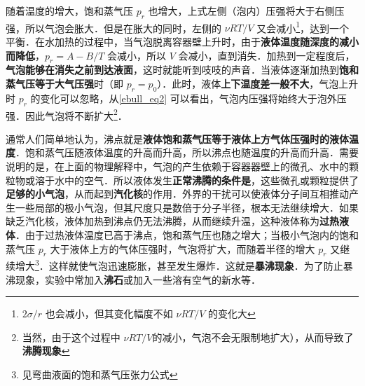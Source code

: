 随着温度的增大，饱和蒸气压 $p_r$ 也增大，上式左侧（泡内）压强将大于右侧压强，所以气泡会胀大．但是在胀大的同时，左侧的 $\nu RT/V$ 又会减小\footnote{$2\sigma/r$ 也会减小，但其变化幅度不如 $\nu RT/V$ 的变化大}，达到一个平衡．在水加热的过程中，当气泡脱离容器壁上升时，由于\textbf{液体温度随深度的减小而降低}，$p_r=A-B/T$ 会减小，所以 $V$ 会减小，直到消失．加热到一定程度后，\textbf{气泡能够在消失之前到达液面}，这时就能听到吱吱的声音．当液体逐渐加热到\textbf{饱和蒸气压等于大气压强}时（即 $p_r=p_0$）．此时，液体\textbf{上下温度差一般不大}，气泡上升时 $p_r$ 的变化可以忽略，从\autoref{ebull_eq2} 可以看出，气泡内压强将始终大于泡外压强．因此气泡将不断扩大\footnote{当然，由于这个过程中 $\nu RT/V$的减小，气泡不会无限制地扩大），从而导致了\textbf{沸腾现象}}．

通常人们简单地认为，沸点就是\textbf{液体饱和蒸气压等于液体上方气体压强时的液体温度}．饱和蒸气压随液体温度的升高而升高，所以沸点也随温度的升高而升高．需要说明的是，在上面的物理解释中，气泡的产生依赖于容器器壁上的微孔、水中的颗粒物或溶于水中的空气．所以液体发生\textbf{正常沸腾的条件是}，这些微孔或颗粒提供了\textbf{足够的小气泡}，从而起到\textbf{汽化核}的作用．外界的干扰可以使液体分子间互相推动产生一些局部的极小气泡，但其尺度只是数倍于分子半径，根本无法继续增大．如果缺乏汽化核，液体加热到沸点仍无法沸腾，从而继续升温，这种液体称为\textbf{过热液体}．由于过热液体温度已高于沸点，饱和蒸气压也随之增大；当极小气泡内的饱和蒸气压 $p_r$ 大于液体上方的气体压强时，气泡将扩大，而随着半径的增大 $p_r$ 又继续增大\footnote{见弯曲液面的饱和蒸气压张力公式}．这样就使气泡迅速膨胀，甚至发生爆炸．这就是\textbf{暴沸现象}．为了防止暴沸现象，实验中常加入\textbf{沸石}或加入一些溶有空气的新水等．
